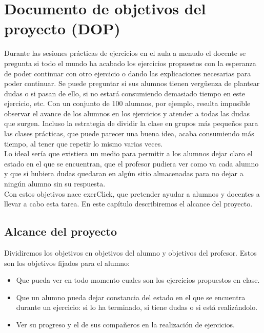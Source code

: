 
\pagestyle{fancy}

\chapter{Documento de objetivos del proyecto (DOP)}
\label{objetivos}

Durante las sesiones prácticas de ejercicios en el aula a menudo el docente se pregunta si todo el mundo ha acabado los ejercicios propuestos con la esperanza de poder continuar con otro ejercicio o dando las explicaciones necesarias para poder continuar. Se puede preguntar si sus alumnos tienen vergüenza de plantear dudas o si pasan de ello, si no estará consumiendo demasiado tiempo en este ejercicio, etc. Con un conjunto de 100 alumnos, por ejemplo, resulta imposible observar el avance de los alumnos en los ejercicios y atender a todas las dudas que surgen. Incluso la estrategia de dividir la clase en grupos más pequeños para las clases prácticas, que puede parecer una buena idea, acaba consumiendo más tiempo, al tener que repetir lo mismo varias veces.\\

Lo ideal sería que existiera un medio para permitir a los alumnos dejar claro el estado en el que se encuentran, que el profesor pudiera ver como va cada alumno y que si hubiera dudas quedaran en algún sitio almacenadas para no dejar a ningún alumno sin su respuesta.\\

Con estos objetivos nace exerClick, que pretender ayudar a alumnos y docentes a llevar a cabo esta tarea. En este capítulo describiremos el alcance del proyecto.\\

\section{Alcance del proyecto}

Dividiremos los objetivos en objetivos del alumno y objetivos del profesor. Estos son los objetivos fijados para el alumno:

\begin{itemize}
\item Que pueda ver en todo momento cuales son los ejercicios propuestos en clase.
\item Que un alumno pueda dejar constancia del estado en el que se encuentra durante un ejercicio: si lo ha terminado, si tiene dudas o si está realizándolo.
\item Ver su progreso y el de sus compañeros en la realización de ejercicios.
\end{itemize}

